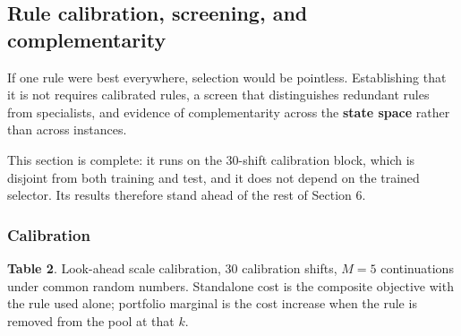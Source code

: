 \documentclass[review,3p,times]{elsarticle}
\theoremstyle{definition}
\begin{document}
\subsection{Rule calibration, screening, and
complementarity}\label{rule-calibration-screening-and-complementarity}

If one rule were best everywhere, selection would be pointless.
Establishing that it is not requires calibrated rules, a screen that
distinguishes redundant rules from specialists, and evidence of
complementarity across the \textbf{state space} rather than across
instances.

This section is complete: it runs on the 30-shift calibration block,
which is disjoint from both training and test, and it does not depend on
the trained selector. Its results therefore stand ahead of the rest of
Section 6.

\subsubsection{Calibration}\label{calibration}

\textbf{Table 2}. Look-ahead scale calibration, 30 calibration shifts,
\(M = 5\) continuations under common random numbers. Standalone cost is
the composite objective with the rule used alone; portfolio marginal is
the cost increase when the rule is removed from the pool at that \(k\).
\end{document}
